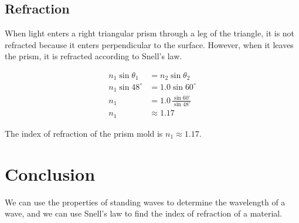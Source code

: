 \documentclass[11pt, titlepage, letterpaper, twoside]{article}
\begin{document}
\subsection{Refraction}

When light enters a right triangular prism through a leg of the triangle, it is not refracted because it enters perpendicular
to the surface. However, when it leaves the prism, it is refracted according to Snell's law.

\begin{align*}
  n_1 \sin \theta_1 &= n_2 \sin \theta_2 \\
  n_1 \sin 48^\circ &= 1.0 \sin 60^\circ \\
  n_1 &= 1.0 \,\frac{\sin 60^\circ}{\sin 48^\circ} \\
  n_1 &\approx 1.17
\end{align*}

The index of refraction of the prism mold is $n_1 \approx 1.17$.

\section{Conclusion}

We can use the properties of standing waves to determine the wavelength of a wave, and we can use Snell's law to find the
index of refraction of a material.
\end{document}
